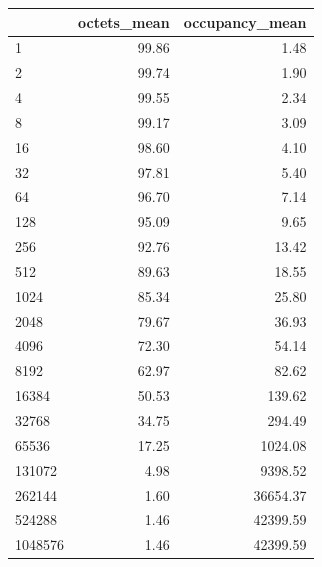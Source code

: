 \begin{tabular}{lrr}
\toprule
 & octets_mean & occupancy_mean \\
\midrule
1 & 99.86 & 1.48 \\
2 & 99.74 & 1.90 \\
4 & 99.55 & 2.34 \\
8 & 99.17 & 3.09 \\
16 & 98.60 & 4.10 \\
32 & 97.81 & 5.40 \\
64 & 96.70 & 7.14 \\
128 & 95.09 & 9.65 \\
256 & 92.76 & 13.42 \\
512 & 89.63 & 18.55 \\
1024 & 85.34 & 25.80 \\
2048 & 79.67 & 36.93 \\
4096 & 72.30 & 54.14 \\
8192 & 62.97 & 82.62 \\
16384 & 50.53 & 139.62 \\
32768 & 34.75 & 294.49 \\
65536 & 17.25 & 1024.08 \\
131072 & 4.98 & 9398.52 \\
262144 & 1.60 & 36654.37 \\
524288 & 1.46 & 42399.59 \\
1048576 & 1.46 & 42399.59 \\
\bottomrule
\end{tabular}
